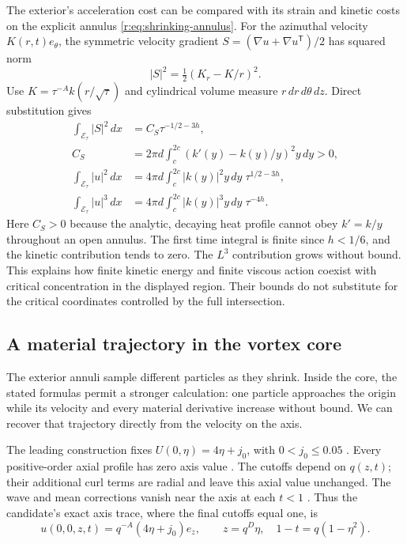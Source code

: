 The exterior's acceleration cost can be compared with its strain and
kinetic costs on the explicit annulus \eqref{r:eq:shrinking-annulus}.
For the azimuthal velocity \(K(r,t)e_\theta\), the symmetric velocity
gradient \(S=(\nabla u+\nabla u^{\mathsf T})/2\) has squared norm
\[
 |S|^2=\tfrac12(K_r-K/r)^2.
\]
Use \(K=\tau^{-A}k(r/\sqrt\tau)\) and cylindrical volume measure
\(r\,dr\,d\theta\,dz\). Direct substitution gives
\begin{equation}
\begin{aligned}
 \int_{\mathcal E_\tau}|S|^2\,dx
 &=C_S\tau^{-1/2-3h},\\
 C_S&=2\pi d\int_c^{2c}(k'(y)-k(y)/y)^2y\,dy>0,\\
 \int_{\mathcal E_\tau}|u|^2\,dx
 &=4\pi d\int_c^{2c}|k(y)|^2y\,dy\;\tau^{1/2-3h},\\
 \int_{\mathcal E_\tau}|u|^3\,dx
 &=4\pi d\int_c^{2c}|k(y)|^3y\,dy\;\tau^{-4h}.
\end{aligned}
\label{r:eq:exterior-strain-critical-costs}
\end{equation}
Here \(C_S>0\) because the analytic, decaying heat profile cannot obey
\(k'=k/y\) throughout an open annulus. The first time integral is finite
since \(h<1/6\), and the kinetic contribution tends to zero. The
\(L^3\) contribution grows without bound. This explains how finite
kinetic energy and finite viscous action coexist with critical
concentration in the displayed region. Their bounds do not substitute
for the critical coordinates controlled by the full intersection.



\subsection{A material trajectory in the vortex core}
\label{r:sec:axis-trajectory}

The exterior annuli sample different particles as they shrink. Inside the
core, the stated formulas permit a stronger calculation: one particle
approaches the origin while its velocity and every material derivative
increase without bound. We can recover that trajectory directly from
the velocity on the axis.

The leading construction fixes \(U(0,\eta)=4\eta+j_0\), with
\(0<j_0\le0.05\)
\cite[p.~37; (B.1), (B.12)]{openai-paper}.
Every positive-order axial profile has zero axis value
\cite[p.~47, Lemma~5.1]{openai-paper}.
The cutoffs depend on \(q(z,t)\); their additional curl terms are radial
and leave this axial value unchanged. The wave and mean corrections
vanish near the axis at each \(t<1\)
\cite[(5.45); pp.~114--115]{openai-paper}.
Thus the candidate's exact axis trace, where the final cutoffs equal one,
is
\begin{equation}
 u(0,0,z,t)=q^{-A}(4\eta+j_0)e_z,\qquad
 z=q^D\eta,\quad 1-t=q(1-\eta^2).
 \label{r:eq:axis-trace}
\end{equation}

